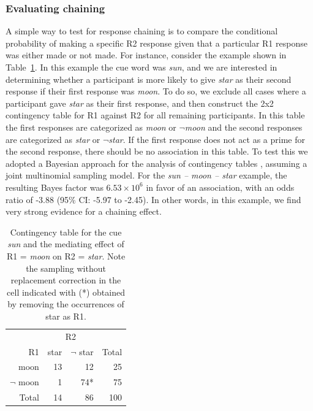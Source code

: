 \documentclass[a4paper,doc,natbib,floatsintext]{apa6}
\newcommand{\stim}[1]{\textsl{#1}}
\begin{document}
\subsubsection{Evaluating chaining}
A simple way to test for response chaining is to compare the conditional probability of making a specific R2 response given that a particular R1 response was either made or not made. For instance, consider the example shown in Table~\ref{Table:contingency}. In this example the cue word was \stim{sun}, and we are interested in determining whether a participant is more likely to give \stim{star} as their second response if their first response was \stim{moon}. To do so, we exclude all cases where a participant gave \stim{star} as their first response, and then construct the 2x2 contingency table for R1 against R2 for all remaining participants. In this table the first responses are categorized as \stim{moon} or \stim{$\neg$moon} and the second responses are categorized as \stim{star} or \stim{$\neg$star}. If the first response does not act as a prime for the second response, there should be no association in this table. To test this we adopted a Bayesian approach for the analysis of contingency tables \citep{Gunel1974,Jamil2017}, assuming a joint multinomial sampling model. For the \stim{sun -- moon -- star} example, the resulting Bayes factor was $6.53\times 10^6$ in favor of an association, with an odds ratio of -3.88 (95\% CI: -5.97 to -2.45). In other words, in this example, we find very strong evidence for a chaining effect.


\begin{table}[t]
\centering
\caption{Contingency table for the cue \stim{sun} and the mediating effect of R1 = \stim{moon} on R2 = \stim{star}.
Note the sampling without replacement correction in the cell indicated with (*) obtained by removing the occurrences of star as R1. }
\label{Table:contingency}
\begin{tabular}{@{}rrrr@{}}
\toprule
& \multicolumn{2}{c}{R2} \\
\cmidrule(r){2-3}
R1 					& star 			& $\neg$ star 			& Total \\
\midrule
moon 				& 13 			& 12					& 25    \\
$\neg$ moon 		& 1 			& 74*					& 75 	\\
Total 			    & 14 			& 86					& 100   \\
\bottomrule
\end{tabular}
\end{table}
\end{document}
